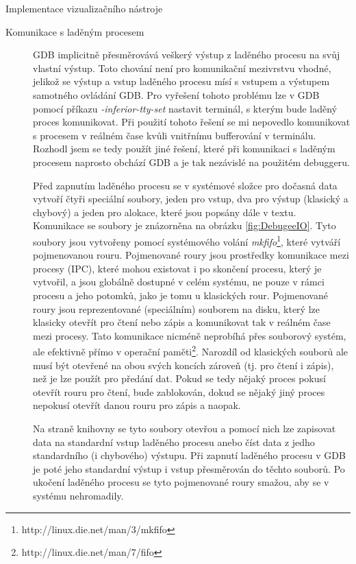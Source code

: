\documentclass[bc,male,python,dept460]{diploma}						%
\newcommand{\parspace}[1][]{
	\ifthenelse{\isempty{#1}}{\vspace{5mm}}{\vspace{#1}}
	\par
}
\begin{document}
\begin{section}{Implementace vizualizačního nástroje}
\begin{description}
			\item[Komunikace s laděným procesem]
			GDB implicitně přesměrovává veškerý výstup z laděného procesu na svůj vlastní výstup. Toto chování není pro komunikační mezivrstvu vhodné,
			jelikož se výstup a vstup laděného procesu mísí s vstupem a výstupem samotného ovládání GDB.
			Pro vyřešení tohoto problému lze v GDB pomocí příkazu \textit{-inferior-tty-set} nastavit terminál, s kterým bude laděný proces komunikovat.
			Při použití tohoto řešení se mi nepovedlo komunikovat s procesem v reálném čase kvůli vnitřnímu bufferování v terminálu.
			Rozhodl jsem se tedy použít jiné řešení, které při komunikaci s laděným procesem naprosto obchází GDB a je tak nezávislé na použitém debuggeru.
			
			\parspace Před zapnutím laděného procesu se v systémové složce pro dočasná data vytvoří čtyři speciální soubory, jeden pro vstup, dva pro výstup
			(klasický a chybový) a jeden pro alokace, které jsou popsány dále v textu. Komunikace se soubory je znázorněna na obrázku \ref{fig:DebugeeIO}.
			Tyto soubory jsou vytvořeny pomocí systémového volání \textit{mkfifo}\footnote{http://linux.die.net/man/3/mkfifo}, které vytváří pojmenovanou rouru.
			Pojmenované roury jsou prostředky komunikace mezi procesy (IPC), které mohou existovat i po skončení procesu, který je vytvořil, a jsou globálně
			dostupné v celém systému, ne pouze v rámci procesu a jeho potomků, jako je tomu u klasických rour. Pojmenované roury jsou reprezentované (speciálním)
			souborem na disku, který lze klasicky otevřít pro čtení nebo zápis a komunikovat tak v reálném čase mezi procesy. Tato komunikace nicméně neprobíhá 
			přes souborový systém, ale efektivně přímo v operační paměti\footnote{http://linux.die.net/man/7/fifo}.
			Narozdíl od klasických souborů ale musí být otevřené na obou svých koncích zároveň (tj. pro čtení i zápis), než je lze použít pro předání dat.
			Pokud se tedy nějaký proces pokusí otevřít rouru pro čtení, bude zablokován, dokud se nějaký jiný proces nepokusí otevřít danou
			rouru pro zápis a naopak.
			
			
			Na straně knihovny se tyto soubory otevřou a pomocí nich lze zapisovat data na standardní vstup laděného procesu anebo číst data z jedho standardního
			(i chybového) výstupu. Při zapnutí laděného procesu v GDB je poté jeho standardní výstup i vstup přesměrován do těchto souborů.
			Po ukočení laděného procesu se tyto pojmenované roury smažou, aby se v systému nehromadily.
			

\end{description}
\end{section}
\end{document}
